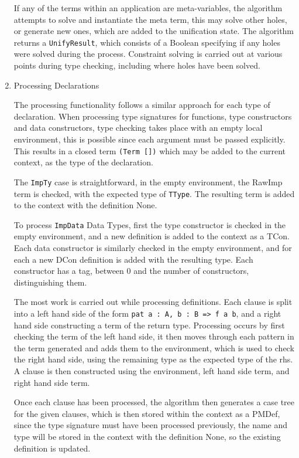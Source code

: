 \documentclass[a4paper]{article}
\begin{document}
\begin{enumerate}
If any of the terms within an application are meta-variables,
the algorithm attempts to solve and instantiate the meta term, this may solve other 
holes, or generate new ones, which are added to the unification state. 
The algorithm returns a \texttt{UnifyResult}, which consists of a Boolean 
specifying if any holes were solved during the process. Constraint solving is carried out
at various points during type checking, including where holes have been solved. 

\item Processing Declarations
\label{sec:orgf0c522c}

The processing functionality follows a similar approach for each type of declaration. 
When processing type signatures for functions, type constructors and
data constructors, type checking takes place with an empty local environment, this is possible since each argument must be passed explicitly. This results in a closed term \texttt{(Term [])} which may be added to the
current context, as the type of the declaration. 

The \texttt{ImpTy} case is straightforward, in the empty environment, the
RawImp term is checked, with the expected type of \texttt{TType}.
The resulting term is added to the context with the definition None. 

To process \texttt{ImpData} Data Types, first the type constructor is checked
in the empty environment, and a new definition is added to the context
as a TCon. Each data constructor is similarly 
checked in the empty environment, and for each a new DCon definition is 
added with the resulting type. Each constructor has a tag, between 0 and the
number of constructors, distinguishing them.  

The most work is carried out while processing definitions. Each clause is
split into a left hand side of the form \texttt{pat a : A, b : B => f a b},
and a right hand side constructing a term of the return type. Processing
occurs by first checking the term of the left hand side, it then moves 
through each pattern in the term generated and adds them to the environment,
which is used to check the right hand side, using the remaining type
as the expected type of the rhs. 
A clause is then constructed using the environment, left hand side term, and right 
hand side term. 

Once each clause has been processed, the algorithm then generates a 
case tree for the given clauses, which is then stored within the context
as a PMDef, since the type signature must have been processed previously, 
the name and type will be stored in the context with the definition None, 
so the existing definition is updated.
\end{enumerate}
\end{document}
